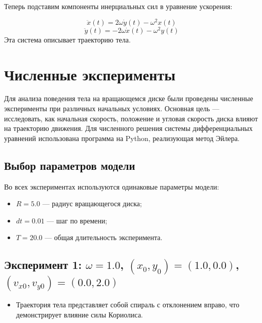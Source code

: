 \documentclass[a4paper,12pt]{article}
\begin{document}
Теперь подставим компоненты инерциальных сил в уравнение ускорения:

\[
\ddot{x}(t) = 2\omega \dot{y}(t) - \omega^2 x(t)
\]
\[
\ddot{y}(t) = -2\omega \dot{x}(t) - \omega^2 y(t)
\]
Эта система описывает траекторию тела.

\newpage

\section{Численные эксперименты}

Для анализа поведения тела на вращающемся диске были проведены численные эксперименты при различных начальных условиях. Основная цель — исследовать, как начальная скорость, положение и угловая скорость диска влияют на траекторию движения. 
Для численного решения системы дифференциальных уравнений использована программа на Python, реализующая метод Эйлера.

\subsection*{Выбор параметров модели}

Во всех экспериментах используются одинаковые параметры модели:

\begin{itemize}
    \item $R = 5.0$ — радиус вращающегося диска;
    \item $dt = 0.01$ — шаг по времени;
    \item $T = 20.0$ — общая длительность эксперимента.
\end{itemize}

\newpage

\subsection*{Эксперимент 1: $\omega = 1.0$, $(x_0, y_0) = (1.0, 0.0)$, $(v_{x0}, v_{y0}) = (0.0, 2.0)$}

\begin{itemize}
    \item Траектория тела представляет собой спираль с отклонением вправо, что демонстрирует влияние силы Кориолиса.
\end{itemize}
\end{document}
